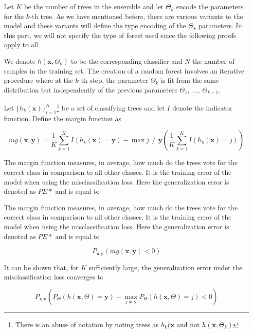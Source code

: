 Let $K$ be the number of trees in the ensemble and let $\Theta_k$ encode the parameters for the $k$-th tree. As we have mentioned before, there are various variants to the model and these variants will define the type encoding of the $\Theta_k$ parameters. In this part, we will not specify the type of forest used since the following proofs apply to all.

We denote $h(\textbf{x},\Theta_k)$ to be the corresponding classifier and $N$ the number of samples in the training set. The creation of a random forest involves an iterative procedure where at the $k$-th step, the parameter $\Theta_k$ is fit from the same distribution but independently of the previous parameters $\Theta_1, \ \ldots, \ \Theta_{k-1}$. %


Let $\{h_k(\textbf{x}) \}_{i=1}^K$\footnote{There is an abuse of notation by noting trees as $h_k(\textbf{x}$ and not $h(\textbf{x}, \Theta_k)$ } be a set of classifying trees and let $I$ denote the indicator function. Define the margin function as

\begin{equation}
mg(\textbf{x},\textbf{y}) = \frac{1}{K}  \sum_{k=1}^K I(h_k(\textbf{x}) = \textbf{y})
- \max{j\neq \textbf{y}}\left(\frac{1}{K} \sum_{k=1}^K I(h_k(\textbf{x}) = j) \right)
\end{equation}\label{eq:rf-marginFun}

The margin function measures, in average, how much do the trees vote for the correct class in comparison to all other classes. It is the training error of the model when using the misclassification loss. Here the generalization error is denoted as $PE*$ and is equal to


The margin function measures, in average, how much do the trees vote for the correct class in comparison to all other classes. It is the training error of the model when using the misclassification loss. Here the generalization error is denoted as $PE*$ and is equal to

\begin{equation}
P_{\textbf{x}, \textbf{y} }(mg(\textbf{x},\textbf{y}) <0)
\end{equation}

 It can be shown that, for $K$ sufficiently large, the generalization error under the misclassification loss converges to

\begin{equation}
 P_{\textbf{x}, \textbf{y} } ( P_{\Theta} (h(\textbf{x}, \Theta) = \textbf{y}) - \max_{j \neq \textbf{y}} P_{\Theta} (h(\textbf{x}, \Theta) = j) < 0)
 \end{equation}

